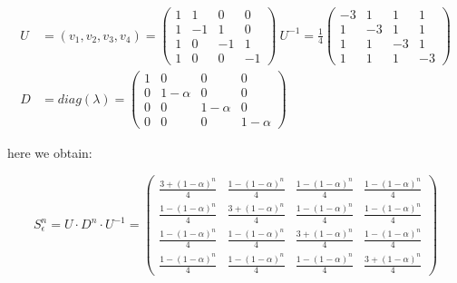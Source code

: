\documentclass[12pt]{book}
\begin{document}
        \begin{align*}
            U &= (v_1,v_2,v_3,v_4) = \left(
                \begin{matrix}
                    1 & 1 & 0 & 0\\
                    1 & -1 & 1 & 0\\
                    1 & 0 & -1 & 1\\
                    1 & 0 & 0 & -1
                \end{matrix}
            \right)\ 
            U ^{-1} = \frac{1}{4}\left(
                \begin{matrix}
                    -3 & 1 & 1 & 1\\
                    1 & -3 & 1 & 1\\
                    1 & 1 & -3 & 1\\
                    1 & 1 & 1 & -3
                \end{matrix}
            \right)\\
            D &= diag(\lambda) = \left(
                \begin{matrix}
                    1 & 0 & 0 & 0\\
                    0 & 1-\alpha & 0 & 0\\
                    0 & 0 & 1-\alpha & 0\\
                    0 & 0 & 0 & 1-\alpha
                \end{matrix}
            \right)
        \end{align*}

        here we obtain:

        \begin{equation*}
            S_{\epsilon}^n = U \cdot D ^n \cdot U ^{-1} = 
            \left(
                \begin{matrix}
                \frac{3 + (1-\alpha)^n}{4} & \frac{1 - (1-\alpha)^n}{4} & \frac{1 - (1-\alpha)^n}{4} & \frac{1 - (1-\alpha)^n}{4} \\
                \frac{1 - (1-\alpha)^n}{4} & \frac{3 + (1-\alpha)^n}{4} & \frac{1 - (1-\alpha)^n}{4} & \frac{1 - (1-\alpha)^n}{4} \\
                \frac{1 - (1-\alpha)^n}{4} & \frac{1 - (1-\alpha)^n}{4} & \frac{3 + (1-\alpha)^n}{4} & \frac{1 - (1-\alpha)^n}{4} \\
                \frac{1 - (1-\alpha)^n}{4} & \frac{1 - (1-\alpha)^n}{4} & \frac{1 - (1-\alpha)^n}{4} & \frac{3 + (1-\alpha)^n}{4}
                \end{matrix}
            \right)
        \end{equation*}
\end{document}
